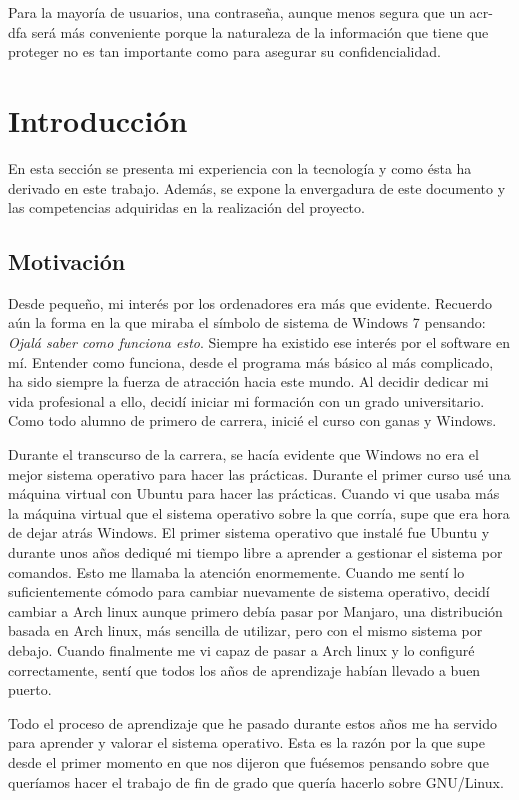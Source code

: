 \documentclass[twoside, titlepage, 12pt, a4paper]{article}
\let\oldsection\section
\def\section{\cleardoublepage\oldsection}
\begin{document}
Para la mayoría de usuarios, una contraseña, aunque menos segura que un \gls{acr-dfa} será más conveniente porque la naturaleza de la información que tiene que proteger no es tan importante como para asegurar su confidencialidad.
\clearpage
\clearpage
\section{Introducción}
En esta sección se presenta mi experiencia con la tecnología y como ésta ha derivado en este trabajo. Además, se expone la envergadura de este documento y las competencias adquiridas en la realización del proyecto.
\subsection{Motivación}
Desde pequeño, mi interés por los ordenadores era más que evidente. Recuerdo aún la forma en la que miraba el símbolo de sistema de Windows 7 pensando: \textit{Ojalá saber como funciona esto}. Siempre ha existido ese interés por el software en mí. Entender como funciona, desde el programa más básico al más complicado, ha sido siempre la fuerza de atracción hacia este mundo. Al decidir dedicar mi vida profesional a ello, decidí iniciar mi formación con un grado universitario.
Como todo alumno de primero de carrera, inicié el curso con ganas y Windows.\par
Durante el transcurso de la carrera, se hacía evidente que Windows no era el mejor sistema operativo para hacer las prácticas. Durante el primer curso usé una máquina virtual con \gls{Ubuntu} para hacer las prácticas. Cuando vi que usaba más la máquina virtual que el sistema operativo sobre la que corría, supe que era hora de dejar atrás Windows. El primer sistema operativo que instalé fue \gls{Ubuntu} y durante unos años dediqué mi tiempo libre a aprender a gestionar el sistema por comandos. Esto me llamaba la atención enormemente. Cuando me sentí lo suficientemente cómodo para cambiar nuevamente de sistema operativo, decidí cambiar a \gls{Arch linux} aunque primero debía pasar por \gls{Manjaro}, una distribución basada en \gls{Arch linux}, más sencilla de utilizar, pero con el mismo sistema por debajo. Cuando finalmente me vi capaz de pasar a \gls{Arch linux} y lo configuré correctamente, sentí que todos los años de aprendizaje habían llevado a buen puerto. \par
Todo el proceso de aprendizaje que he pasado durante estos años me ha servido para aprender y valorar el sistema operativo. Esta es la razón por la que supe desde el primer momento en que nos dijeron que fuésemos pensando sobre que queríamos hacer el trabajo de fin de grado que quería hacerlo sobre \gls{GNU/Linux}.\par
\end{document}
